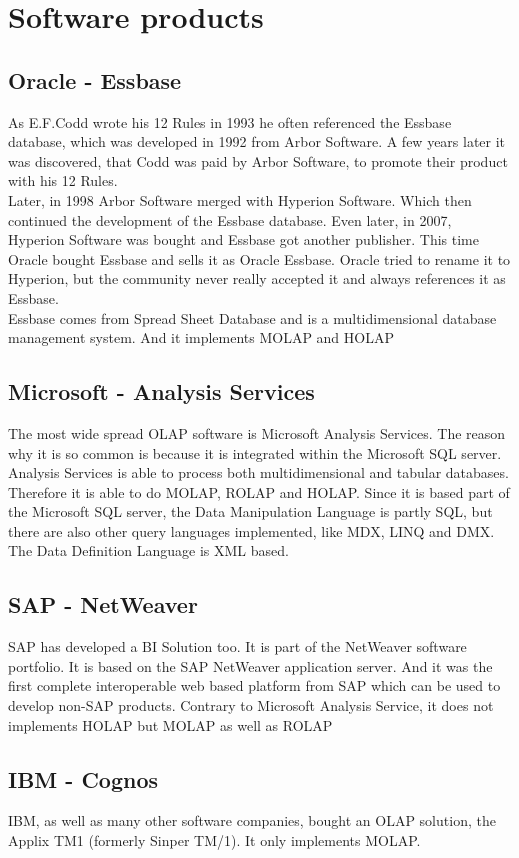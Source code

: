\documentclass[12pt,a4paper,oneside, 
liststotoc, 					%
bibtotoc,						%
titlepage, 						%
headsepline, 					%
BCOR6mm,						%
openany,							%
]{scrreprt}
\begin{document}
\chapter{Software products}\label{software}
\section{Oracle - Essbase}\label{Oracle}
As E.F.Codd wrote his 12 Rules in 1993 he often referenced the Essbase database, which was developed in 1992 from Arbor Software. A few years later it was discovered, that Codd was paid by Arbor Software, to promote their product with his 12 Rules.\\
Later, in 1998 Arbor Software merged with Hyperion Software. Which then continued the development of the Essbase database. Even later, in 2007, Hyperion Software was bought and Essbase got another publisher. This time Oracle bought Essbase and sells it as Oracle Essbase. Oracle tried to rename it to Hyperion, but the community never really accepted it and always references it as Essbase.\\
Essbase comes from Spread Sheet Database and is a multidimensional database management system. And it implements MOLAP and HOLAP
\section{Microsoft - Analysis Services}\label{microsoft}
The most wide spread OLAP software is Microsoft Analysis Services. The reason why it is so common is because it is integrated within the Microsoft SQL server. Analysis Services is able to process both multidimensional and tabular databases. Therefore it is able to do MOLAP, ROLAP and HOLAP. Since it is based part of the Microsoft SQL server, the Data Manipulation Language is partly SQL, but there are also other query languages implemented, like MDX, LINQ and DMX. The Data Definition Language is XML based.
\section{SAP - NetWeaver}\label{SAP}
SAP has developed a BI Solution too. It is part of the NetWeaver software portfolio. It is based on the SAP NetWeaver application server. And it was the first complete interoperable web based platform from SAP which can be used to develop non-SAP products. Contrary to Microsoft Analysis Service, it does not implements HOLAP but MOLAP as well as ROLAP
\section{IBM - Cognos}\label{IBM}
IBM, as well as many other software companies, bought an OLAP solution, the Applix TM1 (formerly Sinper TM/1). It only implements MOLAP.
\end{document}
